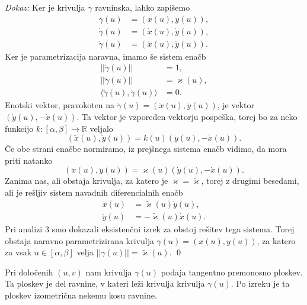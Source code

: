 {\em Dokaz:\/}
 Ker je krivulja $\gamma$ ravninska, lahko zapišemo 
 \begin{align*}
     \gamma(u) &= (x(u), y(u)), \\
     \dot{\gamma}(u) &= (\dot{x}(u), \dot{y}(u)), \\ 
     \ddot{\gamma}(u) &= (\ddot{x}(u), \ddot{y}(u)).
 \end{align*}
 Ker je parametrizacija naravna, imamo še sistem enačb
 \begin{align*}
  \lvert\lvert \dot{\gamma}(u) \rvert\rvert &= 1,   \\
  \lvert\lvert \ddot{\gamma}(u) \rvert\rvert &= \varkappa(u) ,   \\
    \langle \ddot{\gamma}(u), \dot{\gamma}(u) \rangle   &= 0.
 \end{align*}
 Enotski vektor, pravokoten na $\dot{\gamma}(u) = (\dot{x}(u), \dot{y}(u))$, je vektor $(\dot{y}(u), -\dot{x}(u))$. Ta vektor je vzporeden vektorju pospeška,
 torej bo za neko funkcijo $k : [\alpha, \beta]  \to \mathbb{R}$ veljalo 
 \begin{equation*} (\ddot{x}(u), \ddot{y}(u)) = k(u) (\dot{y}(u), -\dot{x}(u)). \end{equation*}Če obe strani enačbe normiramo, iz prejšnega sistema enačb vidimo, da mora priti natanko 
 \begin{equation*} (\ddot{x}(u), \ddot{y}(u)) = \varkappa(u) (\dot{y}(u), -\dot{x}(u)).\end{equation*}Zanima nas, ali obstaja krivulja, za katero je $\varkappa = \tilde{\varkappa}$, torej z drugimi besedami, ali je rešljiv sistem navadnih diferencialnih enačb 
 \begin{align*}
     \ddot{x}(u) &= \tilde{\varkappa}(u) \dot{y}(u), \\
     \ddot{y}(u) &= -\tilde{\varkappa}(u) \dot{x}(u).
 \end{align*}
Pri analizi 3 smo dokazali eksistenčni izrek za obstoj rešitev tega sistema. Torej obstaja
naravno parametrizirana krivulja $\gamma(u) = (x(u), y(u))$, za katero za vsak $u \in [\alpha, \beta]$ velja $\lvert\lvert \ddot{\gamma}(u) \rvert\rvert = \tilde{\varkappa}(u)$.
\qed

\begin{opomba}
 Pri določenih $(u,v)$ nam krivulja $\gamma(u)$ podaja tangentno premonosno ploskev. Ta ploskev je del ravnine, v kateri
 leži krivulja krivulja $\gamma(u)$. Po izreku \href{izr_izometricnost_ploskev_ravnini} je ta ploskev izometrična nekemu kosu ravnine.
\end{opomba}

